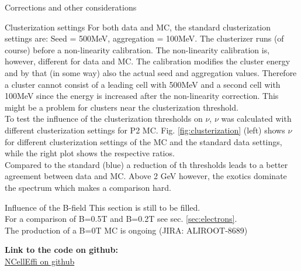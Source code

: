 \documentclass[ALICE]{ALICE_analysis_notes}
\begin{document}
\begin{section}{Corrections and other considerations}
\begin{subsection}{Clusterization settings}
	For both data and MC, the standard clusterization settings are: Seed = 500MeV, aggregation = 100MeV. The clusterizer runs (of course) before a non-linearity calibration. The non-linearity calibration is, however, different for data and MC. The calibration modifies the cluster energy and by that (in some way) also the actual seed and aggregation values. Therefore a cluster cannot consist of a leading cell with 500MeV and a second cell with 100MeV since the energy is increased after the non-linearity correction. This might be a problem for clusters near the clusterization threshold.\\
	To test the influence of the clusterization thresholds on $\nu$, $\nu$ was calculated with different clusterization settings for P2 MC. Fig. \ref{fig:clusterization} (left) shows $\nu$ for different clusterization settings of the MC and the standard data settings, while the right plot shows the respective ratios. \\
	Compared to the standard (blue) a reduction of th thresholds leads to a better agreement between data and MC. Above 2 GeV however, the exotics dominate the spectrum which makes a comparison hard.
	
	

\end{subsection}


\begin{subsection}{Influence of the B-field}
	This section is still to be filled.\\
	For a comparison of B=0.5T and B=0.2T see sec. \ref{sec:electrons}.\\
	The production of a B=0T MC is ongoing (JIRA: ALIROOT-8689)
\end{subsection}
	

\end{section}



\newpage

	
\clearpage
\centering
\textbf{Link to the code on github:}\\
\href{https://github.com/jokonig/EMCal_NCellEffi}{NCellEffi on github}


\clearpage
\end{document}
